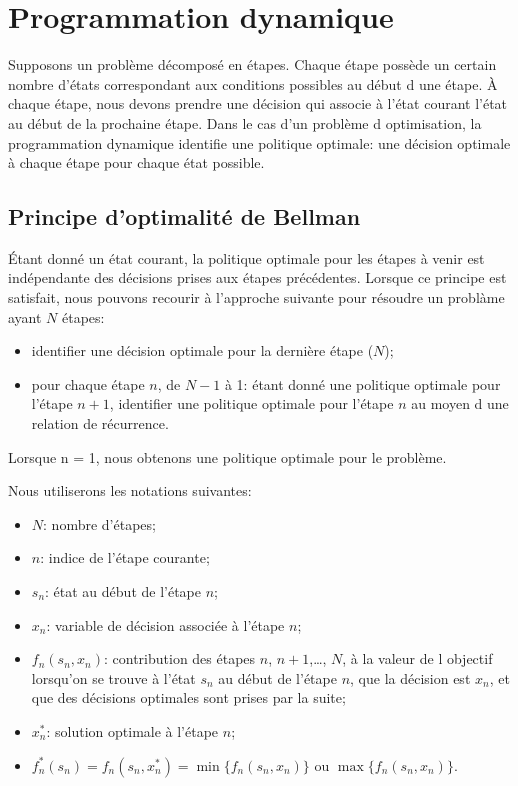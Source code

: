 \chapter{Programmation dynamique}

Supposons un problème décomposé en étapes.
Chaque étape possède un certain nombre d'états correspondant aux conditions possibles au début d une étape.
À chaque étape, nous devons prendre une décision qui associe à l'état courant l'état au début de la prochaine étape.
Dans le cas d'un problème d optimisation, la programmation dynamique identifie une politique optimale: une décision optimale à chaque étape pour chaque état possible.

\section{Principe d'optimalité de Bellman}

Étant donné un état courant, la politique optimale pour les étapes à venir est indépendante des
décisions prises aux étapes précédentes.
Lorsque ce principe est satisfait, nous pouvons recourir à l'approche suivante pour résoudre un problàme ayant $N$ étapes:
\begin{itemize}
\item
identifier une décision optimale pour la dernière étape ($N$);
\item
pour chaque étape $n$, de $N-1$ à 1: étant donné une politique
optimale pour l'étape $n+1$, identifier une politique optimale
pour l'étape $n$ au moyen d une relation de récurrence.
\end{itemize}
Lorsque n = 1, nous obtenons une politique optimale pour le problème.

Nous utiliserons les notations suivantes:
\begin{itemize}
\item
 $N$: nombre d'étapes;
\item
 $n$: indice de l'étape courante;
\item
 $s_n$: état au début de l'étape $n$;
\item
 $x_n$: variable de décision associée à l'étape $n$;
\item
 $f_n(s_n,x_n)$: contribution des étapes $n$, $n+1$,\ldots, $N$, à la valeur de l objectif lorsqu'on se trouve à l'état $s_n$ au début de l'étape $n$, que la décision est $x_n$, et que des décisions optimales sont prises par la suite;
\item
$x_n^*$: solution optimale à l'étape $n$;
\item
 $f_n^*(s_n) = f_n(s_n,x_n^*) = \min \lbrace f_n(s_n,x_n) \rbrace$ ou $\max \lbrace f_n(s_n, x_n) \rbrace$.
\end{itemize}

